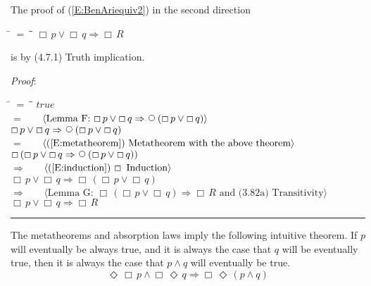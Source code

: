 \documentclass[12pt, fleqn, leqno]{article}
\newcommand{\lgap}{2pt}                             %
\newcommand{\mymathindent}{24pt}                    %
\newcommand{\impl}{\ensuremath{\Rightarrow}}        %
\newcommand{\Next}{\;\,\text{\raisebox{3.5pt}{\circle{6}}}}
\newcommand{\Event}{\Diamond\,}
\newcommand{\Always}{\Box\,}
\newcommand{\myqed}{\rule[-.23ex]{1.2ex}{2.0ex}}
\newcommand{\myqedtab}{\hspace{384pt}}              %
\newcommand{\Gll} {\langle}                         %
\newcommand{\Ggg} {\rangle}                         %
\newcommand{\Hint}[1]     {\ \ \ $\Gll              \mbox{#1} \Ggg$ }   %
\begin{document}
The proof of (\ref{E:BenAriequiv2}) in the second direction
\begin{tabbing}
\hspace{\mymathindent} \= $= \;$ \= \myqedtab \= \kill
  \> $\Always p \lor \Always q \impl \Always R$
\end{tabbing}
is by (4.7.1) Truth implication.

\emph{Proof}:
\begin{tabbing}
\hspace{\mymathindent} \= $= \;$ \= \myqedtab \= \kill
  \> \>   $true$\\[\lgap]
  \> $=$  \>  \Hint{Lemma F: $\Always p \lor \Always q \impl \Next (\Always p \lor \Always q)$}\\[\lgap]
  \> \>   $\Always p \lor \Always q \impl \Next (\Always p \lor \Always q)$\\[\lgap]
  \> $=$  \>  \Hint{(\ref{E:metatheorem}) Metatheorem with the above theorem}\\[\lgap]
  \> \>   $\Always (\Always p \lor \Always q \impl \Next (\Always p \lor \Always q))$\\[\lgap]
  \> $\impl$  \>  \Hint{(\ref{E:induction}) $\Always$ Induction}\\[\lgap]
  \> \>   $\Always p \lor \Always q \impl \Always (\Always p \lor \Always q)$\\[\lgap]
  \> $\impl$  \>  \Hint{Lemma G: $\Always (\Always p \lor \Always q) \impl \Always R$ and (3.82a) Transitivity}\\[\lgap]
  \> \>   $\Always p \lor \Always q \impl \Always R$ \quad \myqed
\end{tabbing}

The metatheorems and absorption laws imply the following intuitive theorem.
If $p$ will eventually be always true, and it is always the case that $q$ will be eventually true, then it is always the case that $p\land q$ will eventually be true.
\begin{equation}\label{E:eventAlwaysPAndAlwaysEventQ}
\Event\Always p\land \Always\Event q \impl \Always\Event (p\land q)
\end{equation}
\end{document}
